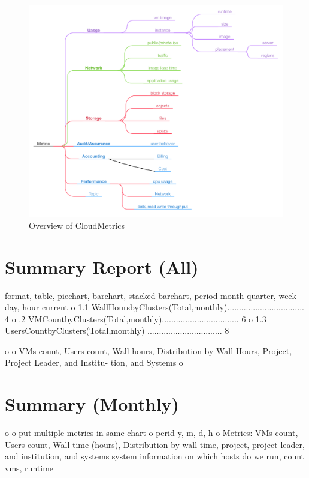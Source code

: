 \documentclass{sig-alternate-05-2015}
\begin{document}
\begin{figure}[h!] 
  \centering 
    \includegraphics[width=1.0\columnwidth]{images/cloudmetric-2.pdf} 
  \caption{Overview of CloudMetrics}\label{F:taxonomy-2} 
\end{figure} 





\section{Summary Report (All)}
                                                                                                        format, table, piechart, barchart, stacked barchart, period month quarter, week day, hour current                                       
o       1.1  WallHoursbyClusters(Total,monthly)................................. 4                              
o       .2  VMCountbyClusters(Total,monthly)................................. 6
o       1.3  UsersCountbyClusters(Total,monthly) ................................ 8 

o       
o       VMs count, Users count, Wall hours, Distribution by Wall Hours, Project, Project Leader, and Institu- tion, and Systems 
o                                               
\section{Summary (Monthly) }
o                       
o       put multiple metrics in same chart
o       perid y, m, d, h                                                                                                
o       Metrics: VMs count, Users count, Wall time (hours), Distribution by wall time, project, project leader, and institution, and systems 
        system information on which hosts do we run, count vms, runtime
\end{document}
